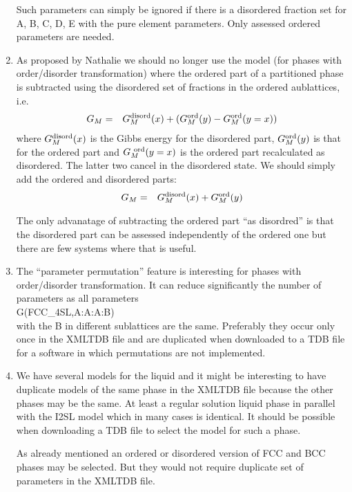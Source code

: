 \documentclass[12pt]{article}
\begin{document}
\begin{enumerate}
  Such parameters can simply be ignored if there is a disordered
  fraction set for A, B, C, D, E with the pure element parameters.
  Only assessed ordered parameters are needed.

\item As proposed by Nathalie we should no longer use the model (for
  phases with order/disorder transformation) where the ordered part of
  a partitioned phase is subtracted using the disordered set of
  fractions in the ordered aublattices, i.e.
  \begin{eqnarray}
    G_M &=& G^{\rm disord}_M(x) + (G^{\rm ord}_M(y) - G^{\rm ord}_M(y=x))
  \end{eqnarray}
  where $G^{\rm disord}_M(x)$ is the Gibbs energy for the disordered
  part, $G^{\rm ord}_M(y)$ is that for the ordered part and
  $G^{\rm~ord}_M(y=x)$ is the ordered part recalculated as disordered.
  The latter two cancel in the disordered state.  We should simply
  add the ordered and disordered parts:
  \begin{eqnarray}
    G_M &=& G^{\rm disord}_M(x) + G^{\rm ord}_M(y)
  \end{eqnarray}

  The only advanatage of subtracting the ordered part ``as disordred''
  is that the disordered part can be assessed independently of the
  ordered one but there are few systems where that is useful.
  
\item The ``parameter permutation'' feature is interesting for phases
  with order/disorder transformation.  It can reduce significantly the
  number of parameters as all parameters\\
  G(FCC\_4SL,A:A:A:B)\\
  with the B in different sublattices are the same.  Preferably they
  occur only once in the XMLTDB file and are duplicated when
  downloaded to a TDB file for a software in which permutations are
  not implemented.

\item We have several models for the liquid and it might be
  interesting to have duplicate models of the same phase in the XMLTDB
  file because the other phases may be the same.  At least a regular
  solution liquid phase in parallel with the I2SL model which in many
  cases is identical.  It should be possible when downloading a TDB
  file to select the model for such a phase.

  As already mentioned an ordered or disordered version of FCC and BCC
  phases may be selected.  But they would not require duplicate set of
  parameters in the XMLTDB file.


\end{enumerate}
\end{document}
